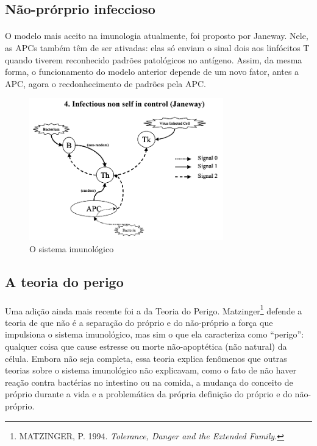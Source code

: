 \documentclass{iiufrgs}
\begin{document}
\subsection{Não-prórprio infeccioso}

\paragraph{}O modelo mais aceito na imunologia atualmente, foi proposto por Janeway. Nele, as APCs também têm de ser ativadas: elas só enviam o sinal dois aos linfócitos T quando tiverem reconhecido padrões patológicos no antígeno. Assim, da mesma forma, o funcionamento do modelo anterior depende de um novo fator, antes a APC, agora o recdonhecimento de padrões pela APC.

\begin{figure}[h]
\centering
\includegraphics[width=0.75\textwidth]{img/signals4-ins.png}
\caption{O sistema imunológico}
\end{figure}

\subsection{A teoria do perigo}

\paragraph{}Uma adição ainda mais recente foi a da Teoria do Perigo. Matzinger\footnote{MATZINGER, P. 1994. \emph{Tolerance, Danger and the Extended Family.}} defende a teoria de que não é a separação do próprio e do não-próprio a força que impulsiona o sistema imunológico, mas sim o que ela caracteriza como ``perigo'': qualquer coisa que cause estresse ou morte não-apoptética (não natural) da célula. Embora não seja completa, essa teoria explica fenômenos que outras teorias sobre o sistema imunológico não explicavam, como o fato de não haver reação contra bactérias no intestino ou na comida, a mudança do conceito de próprio durante a vida e a problemática da própria definição do próprio e do não-próprio.
\end{document}
